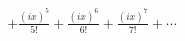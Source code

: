 \documentclass[preview]{standalone}
\begin{document}
\begin{align*}
+ \frac{(ix)^5}{5!}+ \frac{(ix)^6}{6!} + \frac{(ix)^7}{7!} + \cdots
\end{align*}
\end{document}
